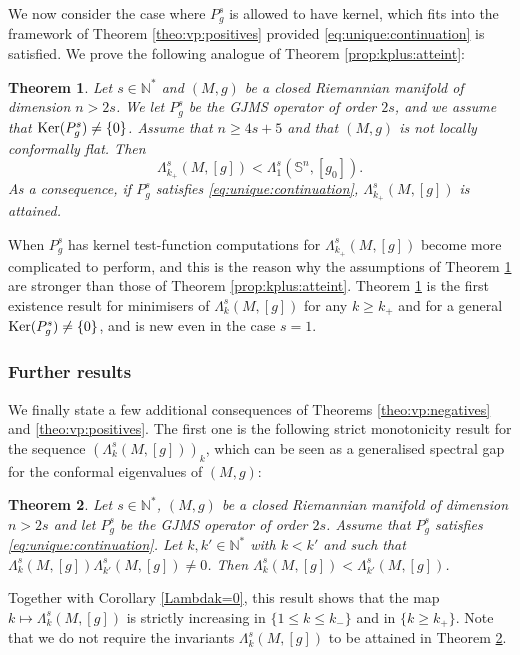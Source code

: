 \documentclass[10pt]{amsart}
\numberwithin{equation}{section}
\newcommand{\N}{\mathbb{N}}
\def\ker{{\mathop{\rm Ker}}}
\theoremstyle{plain}
\newtheorem{theo}{Theorem}[section]%
\theoremstyle{remark}
\begin{document}
\medskip

We now consider the case where $P_g^s$ is allowed to have kernel, which fits into the framework of Theorem \ref{theo:vp:positives} provided \eqref{eq:unique:continuation} is satisfied. We prove the following analogue of Theorem \ref{prop:kplus:atteint}: 
\begin{theo} \label{prop:kplus:atteint:noyau}
Let $s \in \mathbb{N}^*$ and $(M,g)$ be a closed Riemannian manifold of dimension $n > 2s$. We let $P_g^s$ be the GJMS operator of order $2s$, and we assume that $\ker (P_g^s) \neq \{0\}$. Assume that $n \ge 4s+5$ and that $(M,g)$ is not locally conformally flat. Then 
$$ \Lambda_{k_+}^s(M,[g]) < \Lambda_1^s(\mathbb{S}^n, [g_0]).$$
As a consequence, if $P_g^s$ satisfies \eqref{eq:unique:continuation}, $\Lambda_{k_+}^s(M,[g])$ is attained. 
\end{theo}
When $P_g^s$ has kernel test-function computations for $ \Lambda_{k_+}^s(M,[g]) $ become more complicated to perform, and this is the reason why the assumptions of Theorem \ref{prop:kplus:atteint:noyau} are stronger than those of Theorem \ref{prop:kplus:atteint}. Theorem \ref{prop:kplus:atteint:noyau} is the first existence result for minimisers of $\Lambda_{k}^s(M,[g])$ for any $k \ge k_+$ and for a general $\ker(P_g^s) \neq \{0\}$, and is new even in the case $s=1$. 



\subsubsection{Further results} 

We finally state a few additional consequences of Theorems \ref{theo:vp:negatives} and   \ref{theo:vp:positives}. The first one is the following strict monotonicity result for the sequence $(\Lambda_k^s(M,[g]))_k$, which can be seen as a generalised spectral gap for the conformal eigenvalues of $(M,g)$:

\begin{theo} \label{incr_prop}
Let $s \in \mathbb{N}^*$, $(M,g)$ be a closed Riemannian manifold of dimension $n >2s$ and let $P_g^s$ be the GJMS operator of order $2s$. Assume that $P_g^s$ satisfies \eqref{eq:unique:continuation}. Let $k, k' \in \N^*$ with $k<k'$ and such that $\Lambda^s_k(M,[g]) \Lambda^s_{k'}(M,[g]) \not=0$.  Then  $\Lambda^s_k(M,[g])< \Lambda^s_{k'}(M,[g])$. 
\end{theo}
Together with Corollary \ref{Lambdak=0}, this result shows that the map $k \mapsto \Lambda^s_k(M,[g])$ is strictly increasing in $\{ 1 \le k \le k_-\}$ and in $\{k \geq k_+ \}$. Note that we do not require the invariants $\Lambda^s_k(M,[g]) $ to be attained in Theorem \ref{incr_prop}. 
\end{document}
